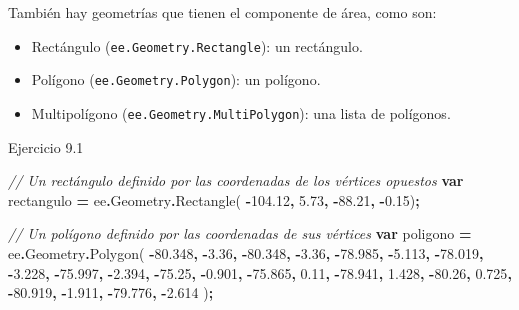 \documentclass[
  12pt,
  letterpaper,
  twoside]{book}
\newenvironment{Shaded}{\begin{snugshade}}{\end{snugshade}}
\newcommand{\AttributeTok}[1]{\textcolor[rgb]{0.77,0.63,0.00}{#1}}
\newcommand{\CommentTok}[1]{\textcolor[rgb]{0.56,0.35,0.01}{\textit{#1}}}
\newcommand{\FloatTok}[1]{\textcolor[rgb]{0.00,0.00,0.81}{#1}}
\newcommand{\FunctionTok}[1]{\textcolor[rgb]{0.00,0.00,0.00}{#1}}
\newcommand{\KeywordTok}[1]{\textcolor[rgb]{0.13,0.29,0.53}{\textbf{#1}}}
\newcommand{\NormalTok}[1]{#1}
\newcommand{\OperatorTok}[1]{\textcolor[rgb]{0.81,0.36,0.00}{\textbf{#1}}}
\providecommand{\tightlist}{%
  \setlength{\itemsep}{0pt}\setlength{\parskip}{0pt}}
\begin{document}
También hay geometrías que tienen el componente de área, como son:

\begin{itemize}
\tightlist
\item
  Rectángulo (\texttt{ee.Geometry.Rectangle}): un rectángulo.
\item
  Polígono (\texttt{ee.Geometry.Polygon}): un polígono.
\item
  Multipolígono (\texttt{ee.Geometry.MultiPolygon}): una lista de polígonos.
\end{itemize}

Ejercicio 9.1

\begin{Shaded}
\begin{Highlighting}[]
\CommentTok{// Un rectángulo definido por las coordenadas de los vértices opuestos}
\KeywordTok{var}\NormalTok{ rectangulo }\OperatorTok{=}\NormalTok{ ee}\OperatorTok{.}\AttributeTok{Geometry}\OperatorTok{.}\FunctionTok{Rectangle}\NormalTok{( }
  \OperatorTok{{-}}\FloatTok{104.12}\OperatorTok{,} \FloatTok{5.73}\OperatorTok{,}
  \OperatorTok{{-}}\FloatTok{88.21}\OperatorTok{,} \OperatorTok{{-}}\FloatTok{0.15}\NormalTok{)}\OperatorTok{;} 

\CommentTok{// Un polígono definido por las coordenadas de sus vértices}
\KeywordTok{var}\NormalTok{ poligono }\OperatorTok{=}\NormalTok{ ee}\OperatorTok{.}\AttributeTok{Geometry}\OperatorTok{.}\FunctionTok{Polygon}\NormalTok{( }
  \OperatorTok{{-}}\FloatTok{80.348}\OperatorTok{,} \OperatorTok{{-}}\FloatTok{3.36}\OperatorTok{,}
  \OperatorTok{{-}}\FloatTok{80.348}\OperatorTok{,} \OperatorTok{{-}}\FloatTok{3.36}\OperatorTok{,}
  \OperatorTok{{-}}\FloatTok{78.985}\OperatorTok{,} \OperatorTok{{-}}\FloatTok{5.113}\OperatorTok{,}
  \OperatorTok{{-}}\FloatTok{78.019}\OperatorTok{,} \OperatorTok{{-}}\FloatTok{3.228}\OperatorTok{,}
  \OperatorTok{{-}}\FloatTok{75.997}\OperatorTok{,} \OperatorTok{{-}}\FloatTok{2.394}\OperatorTok{,}
  \OperatorTok{{-}}\FloatTok{75.25}\OperatorTok{,} \OperatorTok{{-}}\FloatTok{0.901}\OperatorTok{,}
  \OperatorTok{{-}}\FloatTok{75.865}\OperatorTok{,} \FloatTok{0.11}\OperatorTok{,}
  \OperatorTok{{-}}\FloatTok{78.941}\OperatorTok{,} \FloatTok{1.428}\OperatorTok{,}
  \OperatorTok{{-}}\FloatTok{80.26}\OperatorTok{,} \FloatTok{0.725}\OperatorTok{,}
  \OperatorTok{{-}}\FloatTok{80.919}\OperatorTok{,} \OperatorTok{{-}}\FloatTok{1.911}\OperatorTok{,}
  \OperatorTok{{-}}\FloatTok{79.776}\OperatorTok{,} \OperatorTok{{-}}\FloatTok{2.614}
\NormalTok{  )}\OperatorTok{;}


\end{Highlighting}
\end{Shaded}
\end{document}
